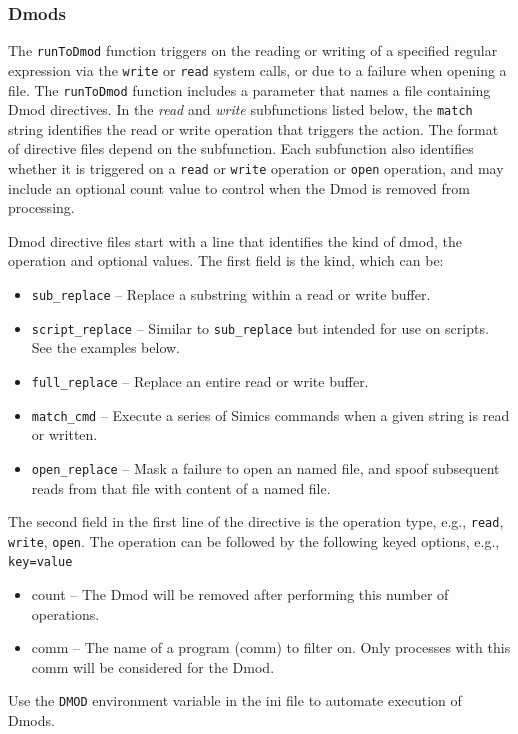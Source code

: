 \documentclass[titlepage]{article}
\begin{document}
\subsubsection{Dmods}
The {\tt runToDmod} function triggers on the reading or writing of a specified
regular expression via the {\tt write} or {\tt read} system calls, or due to a failure
when opening a file.    
The {\tt runToDmod} function includes a parameter that names a file containing
Dmod directives.  In the \textit{read} and \textit{write} subfunctions listed
below, the {\tt match} string identifies the read or write operation that triggers the action. 
The format of directive files depend on the subfunction.  Each subfunction also identifies whether it is
triggered on a {\tt read} or {\tt write} operation or {\tt open} operation, and may include an optional count value to control when
the Dmod is removed from processing.

Dmod directive files start with a line that identifies the kind of dmod, the operation and optional values.
The first field is the kind, which can be:
\begin {itemize}
\item {\tt sub\_replace} -- Replace a substring within a read or write buffer.
\item {\tt script\_replace} -- Similar to {\tt sub\_replace} but intended for use on scripts.  See the examples below.
\item {\tt full\_replace} -- Replace an entire read or write buffer.
\item {\tt match\_cmd} -- Execute a series of Simics commands when a given string is read or written.
\item {\tt open\_replace} -- Mask a failure to open an named file, and spoof subsequent reads from that file with content of a named file.
\end{itemize}
The second field in the first line of the directive is the operation type, e.g., {\tt read}, {\tt write}, {\tt open}.
The operation can be followed by the following keyed options, e.g., {\tt key=value}
\begin{itemize}
\item count -- The Dmod will be removed after performing this number of operations. 
\item comm -- The name of a program (comm) to filter on.  Only processes with this comm will be considered for the Dmod.
\end{itemize}

Use the {\tt DMOD} environment variable in the ini file to automate execution of Dmods.
 
\end{document}
